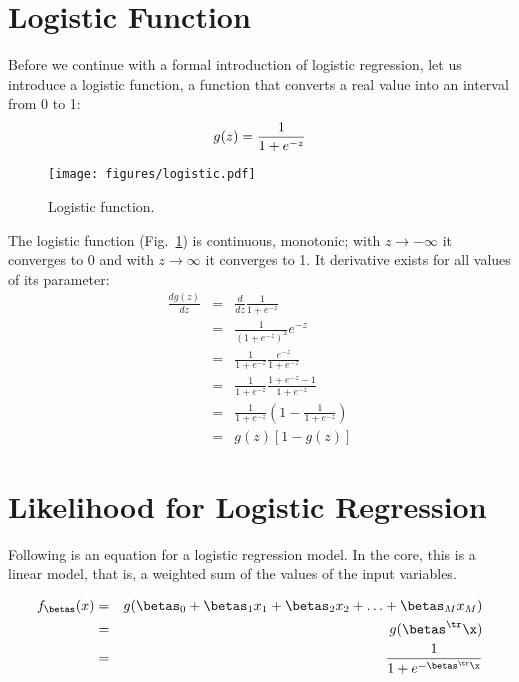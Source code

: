 \begin{refsection}
\section{Logistic Function}

Before we continue with a formal introduction of logistic regression, let us introduce a logistic function, a function that converts a real value into an interval from 0 to 1:
\begin{equation}
  g(z) = {1\over 1+e^{-z}}
\end{equation}

\begin{figure}[htbp]
\begin{center}
\texttt{[image: figures/logistic.pdf]}
\caption{Logistic function.}
\label{f:logistic-function}
\end{center}
\end{figure}

The logistic function (Fig.~\ref{f:logistic-function}) is continuous, monotonic; with $z\to -\infty$ it converges to 0 and with $z\to\infty$ it converges to 1. It derivative exists for all values of its parameter:
\begin{eqnarray}
  \frac{dg(z)}{dz} & = & \frac{d}{dz} \frac{1}{1+e^{-z}} \nonumber \\
  & = & \frac{1}{(1+e^{-z})^2} e^{-z} \nonumber \\
  & = & \frac{1}{1+e^{-z}}\frac{e^{-z}}{1+e^{-z}} \nonumber \\
  & = & \frac{1}{1+e^{-z}}\frac{1+e^{-z}-1}{1+e^{-z}} \nonumber \\
  & = & \frac{1}{1+e^{-z}}\left(1-\frac{1}{1+e^{-z}}\right) \nonumber \\
  & = & g(z)[1-g(z)]
\end{eqnarray}

\section{Likelihood for Logistic Regression}

Following is an equation for a logistic regression model. In the core, this is a linear model, that is, a weighted sum of the values of the input variables. 

\begin{eqnarray}
  f_{\betas}(x) & = & g(\betas_0+\betas_1 x_1+\betas_2 x_2+\ldots + \betas_M x_M)
  \nonumber \\
  & = & g(\betas^\tr \x) \nonumber \\
  & = & \frac{1}{1+e^{-\betas^\tr \x}}
  \label{eq:logreg}
\end{eqnarray}


\end{refsection}
